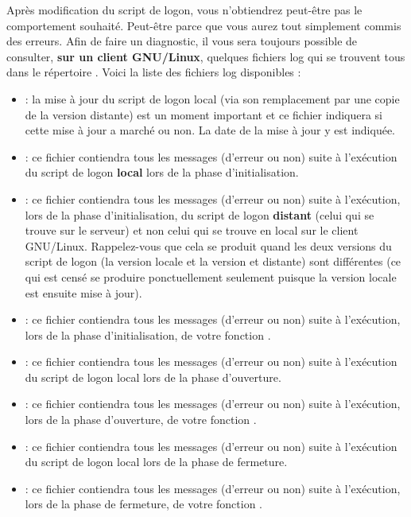 Après modification du script de logon, vous n'obtiendrez
peut-être pas le comportement souhaité. Peut-être parce que vous
aurez tout simplement commis des erreurs. Afin de faire un diagnostic, il
vous sera toujours possible de consulter, \textbf{sur un client
GNU/Linux}, quelques fichiers log qui se trouvent tous dans le répertoire
. Voici la liste des fichiers log
disponibles : 


%
\begin{itemize}

\item {} : la mise à jour du script de
logon local (via son remplacement par une copie de la version distante) est
un moment important et ce fichier indiquera si cette mise à jour
a marché ou non. La date de la mise à jour y est indiquée.


\item {} : ce fichier contiendra
tous les messages (d'erreur ou non) suite à l'exécution du script
de logon \textbf{local} lors de la phase d'initialisation.

\item {} : ce fichier contiendra
tous les messages (d'erreur ou non) suite à l'exécution, lors
de la phase d'initialisation, du script
de logon \textbf{distant} (celui qui se trouve sur le serveur) et non
celui qui se trouve en local sur le client GNU/Linux.
Rappelez-vous que cela se produit quand les deux versions du script
de logon (la version locale et la version et distante) sont différentes
(ce qui est censé se produire ponctuellement seulement puisque la version locale
est ensuite mise à jour).

\item {} : ce fichier contiendra
tous les messages (d'erreur ou non) suite à l'exécution, lors
de la phase d'initialisation, de votre fonction .

\item {} : ce fichier contiendra
tous les messages (d'erreur ou non) suite à l'exécution du script
de logon local lors de la phase d'ouverture.

\item {} : ce fichier contiendra
tous les messages (d'erreur ou non) suite à l'exécution, lors
de la phase d'ouverture, de votre fonction .

\item {} : ce fichier contiendra
tous les messages (d'erreur ou non) suite à l'exécution du script
de logon local lors de la phase de fermeture.

\item {} : ce fichier contiendra
tous les messages (d'erreur ou non) suite à l'exécution, lors
de la phase de fermeture, de votre fonction .

\end{itemize}

